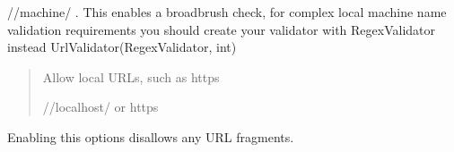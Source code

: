 \documentclass[letterpaper,10pt,english]{sphinxmanual}
\begin{document}
\begin{fulllineitems}
\begin{fulllineitems}
\label{\detokenize{apache_commons_validator_python.routines:apache_commons_validator_python.routines.url_validator.UrlValidator.ALLOW_LOCAL_URLS}}
\pysigstartsignatures
{}
\pysigstopsignatures
\sphinxAtStartPar
//machine/ .
This enables a broad\sphinxhyphen{}brush check, for complex local machine name
validation requirements you should create your validator with
RegexValidator instead UrlValidator(RegexValidator, int)
\begin{quote}\begin{description}
\sphinxAtStartPar
Allow local URLs, such as https

\sphinxAtStartPar
//localhost/ or https

\end{description}\end{quote}

\end{fulllineitems}


\begin{fulllineitems}
\label{\detokenize{apache_commons_validator_python.routines:apache_commons_validator_python.routines.url_validator.UrlValidator.NO_FRAGMENTS}}
\pysigstartsignatures
{}
\pysigstopsignatures
\sphinxAtStartPar
Enabling this options disallows any URL fragments.

\end{fulllineitems}


\begin{fulllineitems}
\label{\detokenize{apache_commons_validator_python.routines:apache_commons_validator_python.routines.url_validator.UrlValidator.cloneable}}
\pysigstartsignatures
{}
\pysigstopsignatures
\end{fulllineitems}


\end{fulllineitems}
\end{document}
